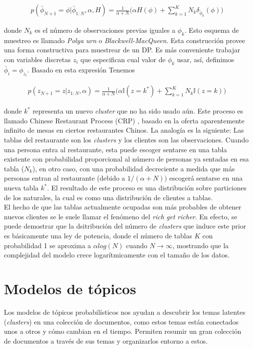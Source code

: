 \begin{align}
p(\bar{\phi}_{N+1}=\phi|\bar{\phi}_{1:N}, \alpha, H) = \frac{1}{\alpha+N}\bigg(\alpha H(\phi)+\sum_{k=1}^{K}N_{k}\delta_{\bar{\phi}_{k}}(\phi)\bigg)
\end{align}

donde $N_{k}$ es el número de observaciones previas iguales a $\phi_{k}$. Esto esquema de muestreo es llamado \textit{Polya urn} o \textit{Blackwell-MacQueen}. Esta construcción provee una forma constructiva para muestrear de un DP. Es más conveniente trabajar con variables discretas $z_{i}$ que especifican cual valor de $\phi_{k}$ usar, así, definimos $\bar{\phi}_{i}=\phi_{z_{i}}$. Basado en esta expresión Tenemos

\begin{align}
p(z_{N+1}=z|z_{1:N}, \alpha) = \frac{1}{\alpha+N}\bigg(\alpha\mathbb{I}(z=k^{*})+\sum_{k=1}^{K}N_{k}\mathbb{I}(z=k)\bigg)
\end{align}

donde $k^{*}$ representa un nuevo \textit{cluster} que no ha sido usado aún. Este proceso es llamado Chinese Restaurant Process (CRP) \citep{aldous1985exchangeability}, basado en la oferta aparentemente infinito de mesas en ciertos restaurantes Chinos. La analogía es la siguiente: Las tablas del restaurante son los \textit{clusters}  y los clientes son las observaciones. Cuando una persona entra al restaurante, esta puede escoger sentarse en una tabla existente con probabilidad proporcional al número de personas ya sentadas en esa tabla ($N_{k}$), en otro caso, con una probabilidad decreciente a medida que más personas entran al restaurante (debido a $1/(\alpha +N))$ escogerá sentarse en una nueva tabla $k^{*}$. El resultado de este proceso es una distribución sobre particiones de los naturales, la cual es como una distribución de clientes a tablas.\\

El hecho de que las tablas actualmente ocupadas son más probables de obtener nuevos clientes se le suele llamar el fenómeno del \textit{rich get richer}. En efecto, se puede demostrar que la dsitribución del número de \textit{clusters} que induce este prior es básicamente una ley de potencia, donde el número de tablas $K$ con probabilidad 1 se aproxima a $\alpha log(N)$ cuando $N\rightarrow \infty$, mostrando que la complejidad del modelo crece logarítmicamente con el tamaño de los datos.

\section{Modelos de tópicos}
\label{sec:topic_models}
Los modelos de tópicos probabilísticos nos ayudan a descubrir los temas latentes (\textit{clusters}) en una colección de documentos, como estos temas están conectados unos a otros y cómo cambian en el tiempo. Permiten resumir un gran colección de documentos a través de sus temas y organizarlos entorno a estos.\\

